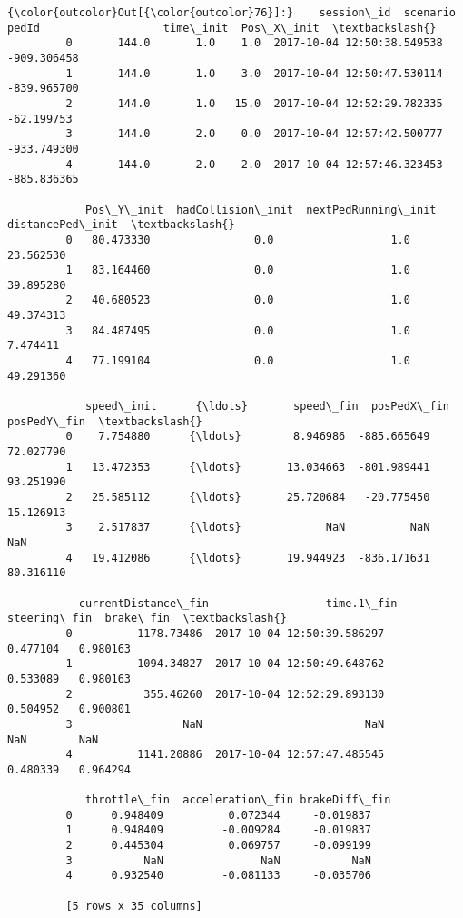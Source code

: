 \documentclass[11pt]{article}
\begin{document}
\begin{Verbatim}[commandchars=\\\{\}]
{\color{outcolor}Out[{\color{outcolor}76}]:}    session\_id  scenario  pedId                   time\_init  Pos\_X\_init  \textbackslash{}
         0       144.0       1.0    1.0  2017-10-04 12:50:38.549538 -909.306458   
         1       144.0       1.0    3.0  2017-10-04 12:50:47.530114 -839.965700   
         2       144.0       1.0   15.0  2017-10-04 12:52:29.782335  -62.199753   
         3       144.0       2.0    0.0  2017-10-04 12:57:42.500777 -933.749300   
         4       144.0       2.0    2.0  2017-10-04 12:57:46.323453 -885.836365   
         
            Pos\_Y\_init  hadCollision\_init  nextPedRunning\_init  distancePed\_init  \textbackslash{}
         0   80.473330                0.0                  1.0         23.562530   
         1   83.164460                0.0                  1.0         39.895280   
         2   40.680523                0.0                  1.0         49.374313   
         3   84.487495                0.0                  1.0          7.474411   
         4   77.199104                0.0                  1.0         49.291360   
         
            speed\_init      {\ldots}       speed\_fin  posPedX\_fin  posPedY\_fin  \textbackslash{}
         0    7.754880      {\ldots}        8.946986  -885.665649    72.027790   
         1   13.472353      {\ldots}       13.034663  -801.989441    93.251990   
         2   25.585112      {\ldots}       25.720684   -20.775450    15.126913   
         3    2.517837      {\ldots}             NaN          NaN          NaN   
         4   19.412086      {\ldots}       19.944923  -836.171631    80.316110   
         
           currentDistance\_fin                  time.1\_fin  steering\_fin  brake\_fin  \textbackslash{}
         0          1178.73486  2017-10-04 12:50:39.586297      0.477104   0.980163   
         1          1094.34827  2017-10-04 12:50:49.648762      0.533089   0.980163   
         2           355.46260  2017-10-04 12:52:29.893130      0.504952   0.900801   
         3                 NaN                         NaN           NaN        NaN   
         4          1141.20886  2017-10-04 12:57:47.485545      0.480339   0.964294   
         
            throttle\_fin  acceleration\_fin brakeDiff\_fin  
         0      0.948409          0.072344     -0.019837  
         1      0.948409         -0.009284     -0.019837  
         2      0.445304          0.069757     -0.099199  
         3           NaN               NaN           NaN  
         4      0.932540         -0.081133     -0.035706  
         
         [5 rows x 35 columns]
\end{Verbatim}
            
\end{document}
